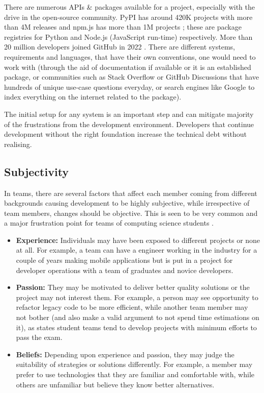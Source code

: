 \documentclass{mprop}
\begin{document}
There are numerous APIs \& packages available for a project, especially with the drive in the open-source community. PyPI has around 420K projects with more than 4M releases \cite{PyPIPythonPackagea} and npm.js has more than 1M projects \cite{NpmBlogArchive}; these are package registries for Python and Node.js (JavaScript run-time) respectively. More than 20 million developers joined GitHub in 2022 \cite{GlobalDeveloperCommunity}. There are different systems, requirements and languages, that have their own conventions, one would need to work with (through the aid of documentation if available or it is an established package, or communities such as Stack Overflow or GitHub Discussions that have hundreds of unique use-case questions everyday, or search engines like Google to index everything on the internet related to the package).

The initial setup for any system is an important step and can mitigate majority of the frustrations from the development environment. Developers that continue development without the right foundation increase the technical debt without realising.

\subsection{Subjectivity}

In teams, there are several factors that affect each member coming from different backgrounds causing development to be highly subjective, while irrespective of team members, changes should be objective. This is seen to be very common and a major frustration point for teams of computing science students \cite{waiteStudentCultureVs2004}.

\begin{itemize}
    \item \textbf{Experience:} Individuals may have been exposed to different projects or none at all. For example, a team can have a engineer working in the industry for a couple of years making mobile applications but is put in a project for developer operations with a team of graduates and novice developers.
    \item \textbf{Passion:} They may be motivated to deliver better quality solutions or the project may not interest them. For example, a person may see opportunity to refactor legacy code to be more efficient, while another team member may not bother (and also make a valid argument to not spend time estimations on it), as \textcite{marzoloExtremeDevelopmentMeans2021} states student teams tend to develop projects with minimum efforts to pass the exam.
    \item \textbf{Beliefs:} Depending upon experience and passion, they may judge the suitability of strategies or solutions differently. For example, a member may prefer to use technologies that they are familiar and comfortable with, while others are unfamiliar but believe they know better alternatives.
\end{itemize}
\end{document}
